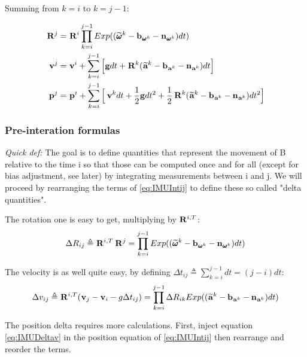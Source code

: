 \documentclass[11pt]{article}
\newcommand{\Rot}[2]{\prescript{#1}{}{\bfR}_{#2}}
\newcommand{\noise}{\bfn}
\newcommand{\bias}{\bfb}
\newcommand{\posi}[2]{\prescript{#1}{}{\bfp}_{#2}}
\newcommand{\vel}[2]{\prescript{#1}{}{\bfv}_{#2}}
\newcommand{\acc}[2]{\prescript{#1}{}{\bfa}_{#2}}
\newcommand{\accm}[2]{\prescript{#1}{}{\widetilde{\bfa}}_{#2}}
\newcommand{\angvel}[2]{\prescript{#1}{}{\pmb{\omega}}_{#2}}
\newcommand{\angvelm}[2]{\prescript{#1}{}{\widetilde{\pmb{\omega}}}_{#2}}
\newcommand{\grav}{\bfg}
\begin{document}
Summing from $k=i$ to $k=j-1$:

\begin{equation}
\begin{split}
\Rot{}{}^{j}  &= \Rot{}{}^{i} \prod_{k=i}^{j-1} Exp((\angvelm{}{}^k - \bias_{\angvel{}{}^k} - \noise_{\angvel{}{}^k})dt)
\\
\vel{}{}^{j}  &= \vel{}{}^{i} + \sum_{k=i}^{j-1} \Big[\grav dt + \Rot{}{}^{k}(\accm{}{}^k - \bias_{\acc{}{}^k} - \noise_{\acc{}{}^k})dt \Big]
\\
\posi{}{}^{j} &= \posi{}{}^{i} + \sum_{k=i}^{j-1} \Big[\vel{}{}^{k}dt + \frac{1}{2}\grav dt^2 
+ \frac{1}{2}\Rot{}{}^{k}(\accm{}{}^k - \bias_{\acc{}{}^k} - \noise_{\acc{}{}^k})dt^2 \Big]
\end{split}
\label{eq:IMUIntij}
\end{equation}

\subsubsection{Pre-interation formulas}
\textit{Quick def:} The goal is to define quantities that represent the movement of B relative to the time i so that those can be computed once and for all (except for bias adjustment, see later) by integrating measurements between i and j. We will proceed by rearranging the terms of \ref{eq:IMUIntij} to define these so called "delta quantities".

The rotation one is easy to get, multiplying by $\Rot{}{}^{i,T}$:
\begin{equation}
    \Delta R_{ij} \triangleq \Rot{}{}^{i,T} \Rot{}{}^{j} = \prod_{k=i}^{j-1} Exp((\angvelm{}{}^k - \bias_{\angvel{}{}^k} - \noise_{\angvel{}{}^k})dt)
    \label{eq:IMUDeltaR}
\end{equation}

The velocity is as well quite easy, by defining $\Delta t_{ij} \triangleq \sum_{k=i}^{j-1} dt = (j-i)dt$:
\begin{equation}
    \Delta v_{ij} \triangleq \Rot{}{}^{i,T} (\vel{}{j} - \vel{}{i} - g \Delta t_{ij}) 
    = \prod_{k=i}^{j-1} \Delta R_{ik} Exp((\accm{}{}^k - \bias_{\acc{}{}^k} - \noise_{\acc{}{}^k})dt)
    \label{eq:IMUDeltav}
\end{equation}

The position delta requires more calculations. First, inject equation \ref{eq:IMUDeltav} in the position equation of \ref{eq:IMUIntij} then rearrange and reorder the terms.
\end{document}
